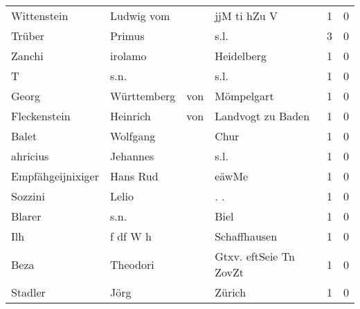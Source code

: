 \begin{center}
\begin{tiny}
\begin{longtabu}{llllrr}
              Wittenstein &                         Ludwig vom &             &                                jjM ti hZu V &          1 &         0 \\
                   Trüber &                             Primus &             &                                        s.l. &          3 &         0 \\
                   Zanchi &                            irolamo &             &                                  Heidelberg &          1 &         0 \\
                        T &                               s.n. &             &                                        s.l. &          1 &         0 \\
                    Georg &                        Württemberg &         von &                                  Mömpelgart &          1 &         0 \\
             Fleckenstein &                           Heinrich &         von &                           Landvogt zu Baden &          1 &         0 \\
                    Balet &                           Wolfgang &             &                                        Chur &          1 &         0 \\
                 ahricius &                           Jehannes &             &                                        s.l. &          1 &         0 \\
        Empfähgeijnixiger &                           Hans Rud &             &                                       eäwMe &          1 &         0 \\
                  Sozzini &                              Lelio &             &                                        . .  &          1 &         0 \\
                   Blarer &                               s.n. &             &                                        Biel &          1 &         0 \\
                      Ilh &                           f df W h &             &                                Schaffhausen &          1 &         0 \\
                     Beza &                           Theodori &             &                      Gtxv. eftSeie Tn ZovZt &          1 &         0 \\
                  Stadler &                               Jörg &             &                                      Zürich &          1 &         0 \\

\end{longtabu}
\end{tiny}
\end{center}
